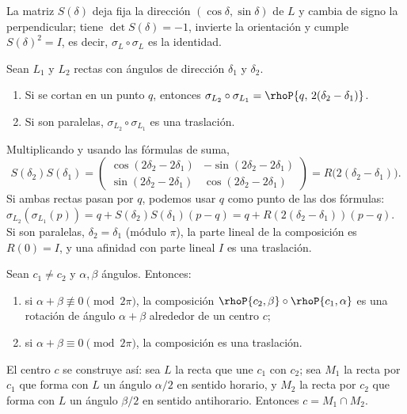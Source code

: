 La matriz \(S(\delta)\) deja fija la dirección \((\cos\delta,\sin\delta)\) de \(L\) y cambia
de signo la perpendicular; tiene \(\det S(\delta)=-1\), invierte la orientación y cumple
\(S(\delta)^2=I\), es decir, \(\sigma_L\circ\sigma_L\) es la identidad.

\begin{proposicion}\label{prop:dos-reflexiones}
Sean \(L_1\) y \(L_2\) rectas con ángulos de dirección \(\delta_1\) y \(\delta_2\).
\begin{enumerate}
  \item Si se cortan en un punto \(q\), entonces
  \(\sigma_{L_2}\circ\sigma_{L_1}=\rhoP{q,\,2(\delta_2-\delta_1)}\).
  \item Si son paralelas, \(\sigma_{L_2}\circ\sigma_{L_1}\) es una traslación.
\end{enumerate}
\end{proposicion}

\begin{demostracion}
Multiplicando y usando las fórmulas de suma,
\[
S(\delta_2)S(\delta_1)=
\begin{pmatrix}
\cos(2\delta_2-2\delta_1)&-\sin(2\delta_2-2\delta_1)\\
\sin(2\delta_2-2\delta_1)&\cos(2\delta_2-2\delta_1)
\end{pmatrix}
=R\bigl(2(\delta_2-\delta_1)\bigr).
\]
Si ambas rectas pasan por \(q\), podemos usar \(q\) como punto de las dos fórmulas:
\(\sigma_{L_2}(\sigma_{L_1}(p))=q+S(\delta_2)S(\delta_1)(p-q)=q+R(2(\delta_2-\delta_1))(p-q)\).
Si son paralelas, \(\delta_2=\delta_1\) (módulo \(\pi\)), la parte lineal de la composición es
\(R(0)=I\), y una afinidad con parte lineal \(I\) es una traslación.
\end{demostracion}

\begin{proposicion}\label{prop:composicion-rotaciones}
Sean \(c_1\neq c_2\) y \(\alpha,\beta\) ángulos. Entonces:
\begin{enumerate}
  \item si \(\alpha+\beta\not\equiv0\pmod{2\pi}\), la composición
  \(\rhoP{c_2,\beta}\circ\rhoP{c_1,\alpha}\) es una rotación de ángulo \(\alpha+\beta\)
  alrededor de un centro \(c\);
  \item si \(\alpha+\beta\equiv0\pmod{2\pi}\), la composición es una traslación.
\end{enumerate}
El centro \(c\) se construye así: sea \(L\) la recta que une \(c_1\) con \(c_2\); sea \(M_1\)
la recta por \(c_1\) que forma con \(L\) un ángulo \(\alpha/2\) en sentido horario, y \(M_2\)
la recta por \(c_2\) que forma con \(L\) un ángulo \(\beta/2\) en sentido antihorario.
Entonces \(c=M_1\cap M_2\).
\end{proposicion}

